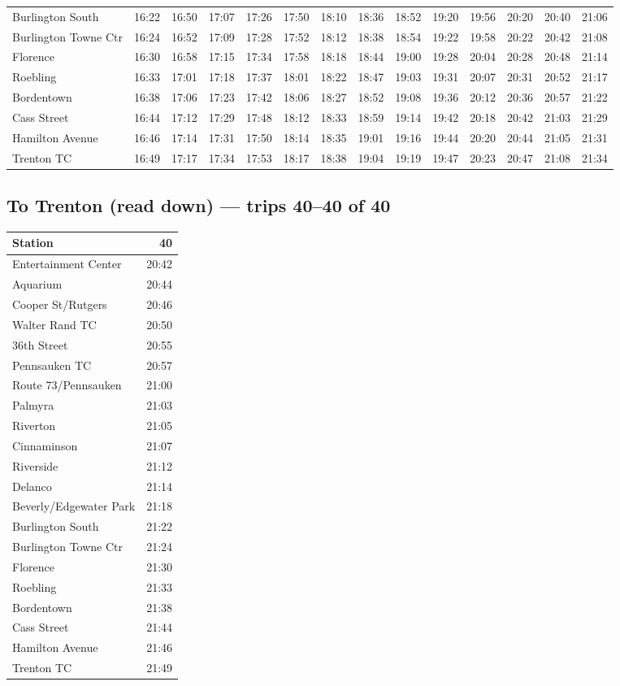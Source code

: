\begin{center}
\begin{tabular}{@{}lrrrrrrrrrrrrr@{}}
Burlington South & 16:22 & 16:50 & 17:07 & 17:26 & 17:50 & 18:10 & 18:36 & 18:52 & 19:20 & 19:56 & 20:20 & 20:40 & 21:06 \\
Burlington Towne Ctr & 16:24 & 16:52 & 17:09 & 17:28 & 17:52 & 18:12 & 18:38 & 18:54 & 19:22 & 19:58 & 20:22 & 20:42 & 21:08 \\
Florence & 16:30 & 16:58 & 17:15 & 17:34 & 17:58 & 18:18 & 18:44 & 19:00 & 19:28 & 20:04 & 20:28 & 20:48 & 21:14 \\
Roebling & 16:33 & 17:01 & 17:18 & 17:37 & 18:01 & 18:22 & 18:47 & 19:03 & 19:31 & 20:07 & 20:31 & 20:52 & 21:17 \\
Bordentown & 16:38 & 17:06 & 17:23 & 17:42 & 18:06 & 18:27 & 18:52 & 19:08 & 19:36 & 20:12 & 20:36 & 20:57 & 21:22 \\
Cass Street & 16:44 & 17:12 & 17:29 & 17:48 & 18:12 & 18:33 & 18:59 & 19:14 & 19:42 & 20:18 & 20:42 & 21:03 & 21:29 \\
Hamilton Avenue & 16:46 & 17:14 & 17:31 & 17:50 & 18:14 & 18:35 & 19:01 & 19:16 & 19:44 & 20:20 & 20:44 & 21:05 & 21:31 \\
Trenton TC & 16:49 & 17:17 & 17:34 & 17:53 & 18:17 & 18:38 & 19:04 & 19:19 & 19:47 & 20:23 & 20:47 & 21:08 & 21:34 \\
\bottomrule\end{tabular}\end{center}
\subsection*{To Trenton (read down) --- trips 40--40 of 40}
\begin{center}\footnotesize\setlength{\tabcolsep}{3pt}\begin{tabular}{@{}lr@{}}\toprule
Station & 40 \\\midrule
Entertainment Center & 20:42 \\
Aquarium & 20:44 \\
Cooper St/Rutgers & 20:46 \\
Walter Rand TC & 20:50 \\
36th Street & 20:55 \\
Pennsauken TC & 20:57 \\
Route 73/Pennsauken & 21:00 \\
Palmyra & 21:03 \\
Riverton & 21:05 \\
Cinnaminson & 21:07 \\
Riverside & 21:12 \\
Delanco & 21:14 \\
Beverly/Edgewater Park & 21:18 \\
Burlington South & 21:22 \\
Burlington Towne Ctr & 21:24 \\
Florence & 21:30 \\
Roebling & 21:33 \\
Bordentown & 21:38 \\
Cass Street & 21:44 \\
Hamilton Avenue & 21:46 \\
Trenton TC & 21:49 \\
\bottomrule\end{tabular}\end{center}
